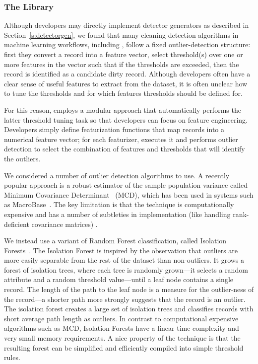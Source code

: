 \subsubsection{The \detectlib Library}
Although developers may directly implement detector generators as described in Section~\ref{s:detectorgen}, we found that many cleaning detection algorithms in machine learning workflows, including \company, follow a fixed outlier-detection structure: first they convert a record into a feature vector,  select threshold(s) over one or more features in the vector such that if the thresholds are exceeded, then the record is identified as a candidate dirty record.  Although developers often have a clear sense of useful features to extract from the dataset, it is often unclear how to tune the thresholds and for which features thresholds should be defined for.  

For this reason, \detectlib employs a modular approach that automatically performs the latter threshold tuning task so that developers can focus on feature engineering.   Developers simply define featurization functions that map records into a numerical feature vector; for each featurizer, \detectlib executes it and performs outlier detection to select the combination of features and thresholds that will identify the outliers.  

We considered a number of outlier detection algorithms to use.  A recently popular approach is a robust estimator of the sample population variance called Minimum Covariance Determinant~\cite{} (MCD), which has been used in systems such as MacroBase~\cite{bailis2016macrobase}.  The key limitation is that the technique is computationally expensive and has a number of subtleties in implementation (like handling rank-deficient covariance matrices) .


We instead use a variant of Random Forest classification, called Isolation Forests~\cite{}.  The Isolation Forest is inspired by the observation that outliers are more easily separable from the rest of the dataset than non-outliers.  It grows a forest of isolation trees, where each tree is randomly grown---it selects a random attribute and a random threshold value---until a leaf node contains a single record.  The length of the path to the leaf node is a measure for the outlier-ness of the record---a shorter path more strongly suggests that the record is an outlier.  The isolation forest creates a large set of isolation trees and classifies records with short average path length as outliers.  In contrast to computational expensive algorithms such as MCD, Isolation Forests have a linear time complexity and very small memory requirements.  A nice property of the technique is that the resulting forest can be simplified and efficiently compiled into simple threshold rules. %


